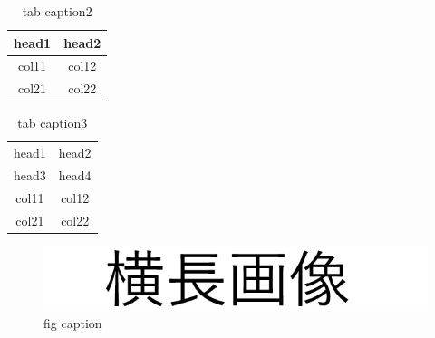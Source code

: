 \documentclass[a4paper,11pt]{jarticle}
\begin{document}
        \begin{table}[h]
            \caption{tab caption2}
            \begin{tabular}{cc} \toprule
                head1 & head2 \\\midrule
                col11 & col12 \\
                col21 & col22 \\\bottomrule
            \end{tabular}
            \label{tab:table2}
        \end{table}

        \begin{table}[h]
            \caption{tab caption3}
            \begin{tabular}{cc} \toprule head1 & head2 \\ head3 & head4 \\\hline col11 & col12 \\ col21 & col22 \\\bottomrule
            \end{tabular}
            \label{tab:table3}
        \end{table}

        \begin{figure}[h]
            \centering
            \includegraphics[width=\paperwidth]{zzz.png}
            \caption{fig caption}
            \label{fig:figure}
        \end{figure}
\end{document}
